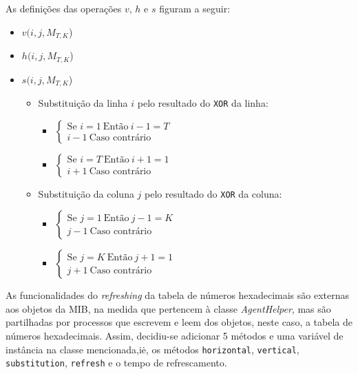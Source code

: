 \newpage

As definições das operações $v$, $h$ e $s$ figuram a seguir:

\begin{itemize}
	\item$v(i, j, M_{T,K}$) 
	\item$h(i, j, M_{T,K}$)  
	\item $s(i, j, M_{T,K}$)
		\begin{itemize}
  \item Substituição da linha $i$ pelo resultado do \texttt{XOR} da linha: 
		\begin{itemize}
			\item $\begin{cases}
					\text{Se } i = 1~\text{Então}~i - 1 = T\\
					      i -1~\text{Caso contrário}
				     \end{cases}$ 
			\item $\begin{cases}
					\text{Se } i = T~\text{Então}~i + 1 = 1\\
					      i + 1~\text{Caso contrário}
				     \end{cases}$ 
		\end{itemize}
	\item  Substituição da coluna $j$ pelo resultado do \texttt{XOR} da coluna: 
		\begin{itemize}
			\item $\begin{cases}
					\text{Se } j = 1~\text{Então}~j - 1 = K\\
					      j - 1~\text{Caso contrário}
				     \end{cases}$ 
			\item $\begin{cases}
					\text{Se } j = K~\text{Então}~j + 1 = 1\\
					      j + 1~\text{Caso contrário}
				     \end{cases}$ 
		\end{itemize}
		\end{itemize}
\end{itemize}


As funcionalidades do \emph{refreshing} da tabela de números hexadecimais são
externas aos objetos da MIB, na medida que pertencem à classe
\emph{AgentHelper}, mas são partilhadas por processos que escrevem e leem dos
objetos, neste caso, a tabela de números hexadecimais. Assim, decidiu-se
adicionar 5 métodos e uma variável de instância na classe mencionada,i\.e,
os métodos \texttt{horizontal}, \texttt{vertical}, \texttt{substitution},
\texttt{refresh} e o tempo de refrescamento.

